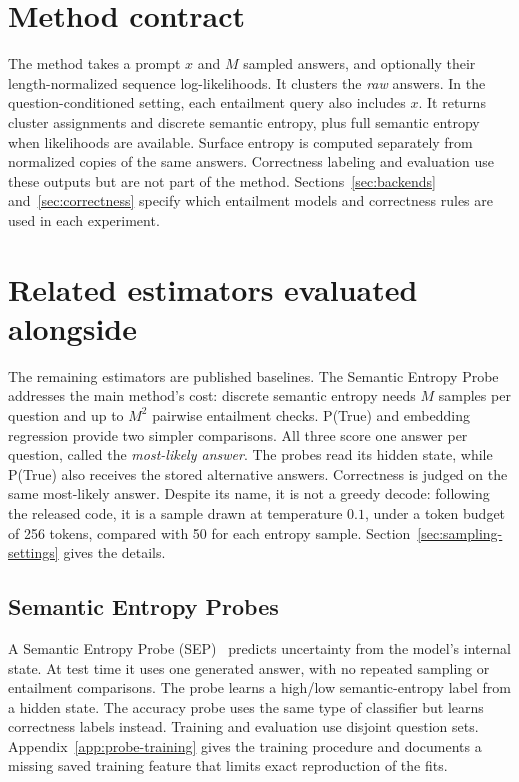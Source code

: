 \section{Method contract}
\label{sec:method-contract}

The method takes a prompt $x$ and $M$ sampled answers, and optionally their
length-normalized sequence log-likelihoods. It clusters the \emph{raw} answers.
In the question-conditioned setting, each entailment query also includes $x$. It returns cluster assignments and discrete semantic entropy, plus full
semantic entropy when likelihoods are available. Surface entropy is computed
separately from normalized copies of the same answers. Correctness labeling
and evaluation use these outputs but are not part of the
method. Sections~\ref{sec:backends} and~\ref{sec:correctness} specify which
entailment models and correctness rules are used in each experiment.

\section{Related estimators evaluated alongside}
\label{sec:related-estimators}

The remaining estimators are published baselines. The Semantic Entropy Probe
addresses the main method's cost: discrete semantic entropy needs $M$ samples
per question and up to $M^2$ pairwise entailment checks. P(True) and embedding
regression provide two simpler comparisons. All three score one answer per
question, called the \emph{most-likely answer}.
The probes read its hidden state, while P(True) also receives the stored
alternative answers. Correctness is judged on the same most-likely answer.
Despite its name, it is not a greedy decode:
following the released code, it is a sample drawn at temperature $0.1$, under a
token budget of 256 tokens, compared with 50 for each entropy sample.
Section~\ref{sec:sampling-settings} gives the details.

\subsection{Semantic Entropy Probes}
\label{sec:sep-method}

A Semantic Entropy Probe (SEP)~\cite{kossen_semantic_entropy_probes_2024}
predicts uncertainty from the model's internal state. At test time it uses one
generated answer, with no repeated sampling or entailment comparisons. The probe learns a
high/low semantic-entropy label from a hidden state.
The accuracy probe uses the same type of classifier but learns correctness
labels instead. Training and evaluation use disjoint question sets.
Appendix~\ref{app:probe-training} gives the training procedure and documents
a missing saved training feature that limits exact reproduction of the fits.

